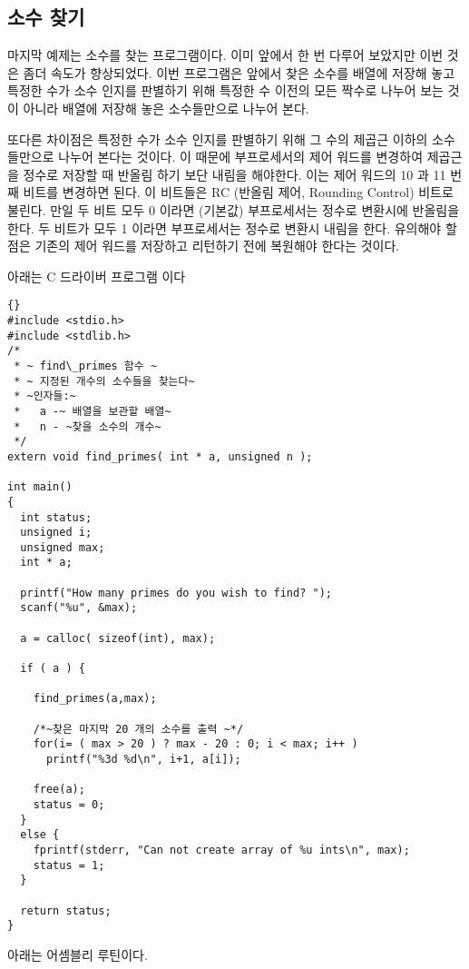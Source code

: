 \subsection{소수 찾기}

마지막 예제는 소수를 찾는 프로그램이다. 이미 앞에서 한 번 다루어 보았지만 
이번 것은 좀더 속도가 향상되었다. 이번 프로그램은 앞에서 찾은 소수를 배열에 저장해
놓고 특정한 수가 소수 인지를 판별하기 위해 특정한 수 이전의 모든 짝수로 나누어 보는
것이 아니라 배열에 저장해 놓은 소수들만으로 나누어 본다. 

또다른 차이점은 특정한 수가 소수 인지를 판별하기 위해 그 수의 제곱근 이하의 소수들만으로
나누어 본다는 것이다. 이 때문에 부프로세서의 제어 워드를 변경하여 제곱근을 정수로 저장할 때
반올림 하기 보단 내림을 해야한다. 이는 제어 워드의 10 과 11 번째 비트를 변경하면 된다. 
이 비트들은 RC (반올림 제어, Rounding Control) 비트로 불린다. 만일 두 비트 모두 0 이라면 (기본값)
부프로세서는 정수로 변환시에 반올림을 한다. 두 비트가 모두 1 이라면 부프로세서는 정수로
변환시 내림을 한다. 유의해야 할 점은 기존의 제어 워드를 저장하고 리턴하기 전에 복원해야 한다는
것이다. 

아래는 C 드라이버 프로그램 이다
\begin{lstlisting}[escapeinside=~~]{}
#include <stdio.h>
#include <stdlib.h>
/*
 * ~ find\_primes 함수 ~
 * ~ 지정된 개수의 소수들을 찾는다~
 * ~인자들:~
 *   a -~ 배열을 보관할 배열~
 *   n - ~찾을 소수의 개수~
 */
extern void find_primes( int * a, unsigned n );

int main()
{
  int status;
  unsigned i;
  unsigned max;
  int * a;

  printf("How many primes do you wish to find? ");
  scanf("%u", &max);

  a = calloc( sizeof(int), max);

  if ( a ) {

    find_primes(a,max);

    /*~찾은 마지막 20 개의 소수를 출력 ~*/
    for(i= ( max > 20 ) ? max - 20 : 0; i < max; i++ )
      printf("%3d %d\n", i+1, a[i]);

    free(a);
    status = 0;
  }
  else {
    fprintf(stderr, "Can not create array of %u ints\n", max);
    status = 1;
  }

  return status;
}
\end{lstlisting}

아래는 어셈블리 루틴이다.


